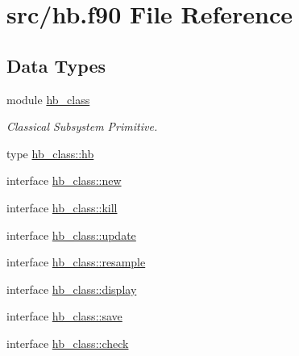 \hypertarget{hb_8f90}{\section{src/hb.f90 File Reference}
\label{hb_8f90}
}
\subsection*{Data Types}
\begin{DoxyCompactItemize}
\item 
module \hyperlink{classhb__class}{hb\+\_\+class}
\begin{DoxyCompactList}\small\item\em Classical Subsystem Primitive. \end{DoxyCompactList}\item 
type \hyperlink{structhb__class_1_1hb}{hb\+\_\+class\+::hb}
\item 
interface \hyperlink{interfacehb__class_1_1new}{hb\+\_\+class\+::new}
\item 
interface \hyperlink{interfacehb__class_1_1kill}{hb\+\_\+class\+::kill}
\item 
interface \hyperlink{interfacehb__class_1_1update}{hb\+\_\+class\+::update}
\item 
interface \hyperlink{interfacehb__class_1_1resample}{hb\+\_\+class\+::resample}
\item 
interface \hyperlink{interfacehb__class_1_1display}{hb\+\_\+class\+::display}
\item 
interface \hyperlink{interfacehb__class_1_1save}{hb\+\_\+class\+::save}
\item 
interface \hyperlink{interfacehb__class_1_1check}{hb\+\_\+class\+::check}
\end{DoxyCompactItemize}
